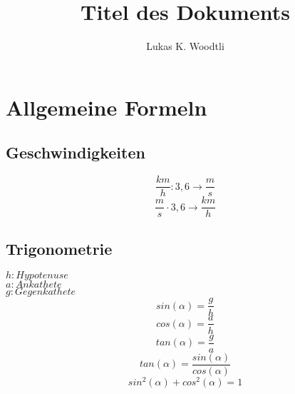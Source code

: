 \documentclass{scrartcl}	%
\title{Titel des Dokuments}
\author{Lukas K. Woodtli}
\begin{document}

\section{Allgemeine Formeln}
\label{sec:AllgemeineFormeln}
\subsection{Geschwindigkeiten}
\label{sec:Geschwindigkeiten}
\[
{
\frac{km}{h}
: 3,6\rightarrow
\frac{m}{s}
}
\]
\[
{
\frac{m}{s}
\cdot 3,6\rightarrow
\frac{km}{h}
}
\]
\subsection{Trigonometrie}
\label{sec:Trigonometrie}

$h: Hypotenuse$	\\
$a: Ankathete$\\
$g: Gegenkathete$
\[
sin(\alpha)=\frac{g}{h}
\]
\[
cos(\alpha)=\frac{a}{h}
\]
\[
tan(\alpha)=\frac{g}{a}
\]
\[
tan(\alpha)=\frac{sin(\alpha)}{cos(\alpha)}
\]
\[
sin^2(\alpha)+cos^2(\alpha)=1
\]
\end{document}
